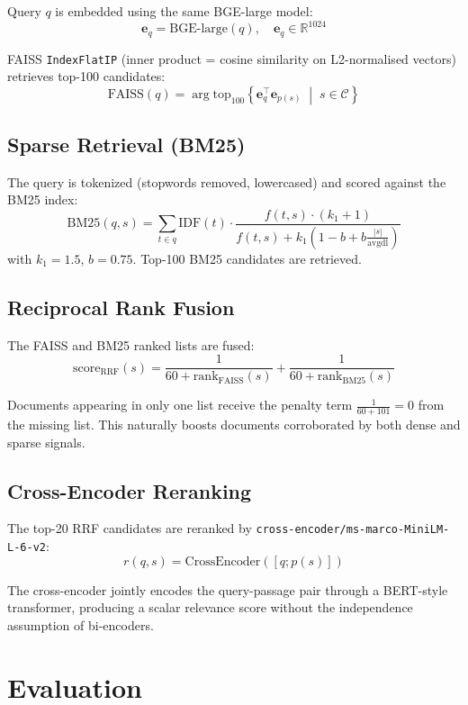 \documentclass[12pt,a4paper]{article}
\begin{document}
Query $q$ is embedded using the same BGE-large model:
\[
  \mathbf{e}_q = \text{BGE-large}(q), \quad \mathbf{e}_q \in \mathbb{R}^{1024}
\]

FAISS \texttt{IndexFlatIP} (inner product = cosine similarity on L2-normalised vectors) retrieves top-100 candidates:
\[
  \text{FAISS}(q) = \arg\!\text{top}_{100}\left\{ \mathbf{e}_q^\top \mathbf{e}_{p(s)} \;\middle|\; s \in \mathcal{C} \right\}
\]

\subsection{Sparse Retrieval (BM25)}

The query is tokenized (stopwords removed, lowercased) and scored against the BM25 index:
\[
  \text{BM25}(q, s) = \sum_{t \in q} \text{IDF}(t) \cdot \frac{f(t,s) \cdot (k_1+1)}{f(t,s) + k_1(1-b+b\frac{|s|}{\text{avgdl}})}
\]
with $k_1=1.5$, $b=0.75$. Top-100 BM25 candidates are retrieved.

\subsection{Reciprocal Rank Fusion}

The FAISS and BM25 ranked lists are fused:
\[
  \text{score}_{\text{RRF}}(s) = \frac{1}{60 + \text{rank}_{\text{FAISS}}(s)} + \frac{1}{60 + \text{rank}_{\text{BM25}}(s)}
\]

Documents appearing in only one list receive the penalty term $\frac{1}{60+101}=0$ from the missing list. This naturally boosts documents corroborated by both dense and sparse signals.

\subsection{Cross-Encoder Reranking}

The top-20 RRF candidates are reranked by \texttt{cross-encoder/ms-marco-MiniLM-L-6-v2}:
\[
  r(q, s) = \text{CrossEncoder}([q; p(s)])
\]

The cross-encoder jointly encodes the query-passage pair through a BERT-style transformer, producing a scalar relevance score without the independence assumption of bi-encoders.

\newpage
\section{Evaluation}
\end{document}
